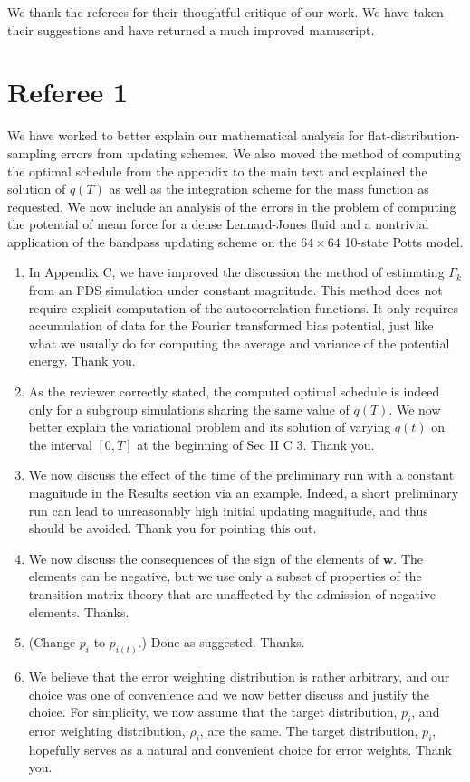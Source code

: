 \documentclass{article}
\begin{document}
We thank the referees for their thoughtful critique of our work. We have taken their suggestions and have returned a much improved manuscript.

\section{Referee 1}

We have worked to better explain our mathematical analysis for flat-distribution-sampling errors from updating schemes. We also moved the method of computing the optimal schedule from the appendix to the main text and explained the solution of $q(T)$ as well as the integration scheme for the mass function as requested. We now include an analysis of the errors in the problem of computing the potential of mean force for a dense Lennard-Jones fluid and a nontrivial application of the bandpass updating scheme on the $64\times64$ 10-state Potts model.

\begin{enumerate}

\item
In Appendix C, we have improved the discussion the method of estimating $\Gamma_k$ from an FDS simulation under constant magnitude.
This method does not require explicit computation
of the autocorrelation functions.
It only requires accumulation of data for
the Fourier transformed bias potential,
just like what we usually do for computing the average and variance of the potential energy.
Thank you.

\item
As the reviewer correctly stated, the computed optimal schedule is indeed only for a subgroup simulations sharing the same value of $q(T)$.
We now better explain the variational problem and its solution of varying $q(t)$ on the interval $[0,T]$ at the beginning of Sec II C 3.
Thank you.

\item
We now discuss the effect of the time of the preliminary run with a constant magnitude in the Results section via an example.
Indeed, a short preliminary run can lead to unreasonably high initial updating magnitude, and thus should be avoided.
Thank you for pointing this out.

\item
We now discuss the consequences of the sign of the elements of $\mathbf w$.
%
The elements can be negative, but we use only a subset of properties of the transition matrix theory that are unaffected by the admission of negative elements.
Thanks.

\item
(Change $p_i$ to $p_{i(t)}$.)
Done as suggested.
Thanks.

\item
We believe that the error weighting distribution is rather arbitrary, and our choice was one of convenience and we now better discuss and justify the choice.
For simplicity, we now assume that the target distribution, $p_i$, and error weighting distribution, $\rho_i$, are the same.
The target distribution, $p_i$, hopefully serves as a natural and convenient choice for error weights.
Thank you.


\end{enumerate}
\end{document}
